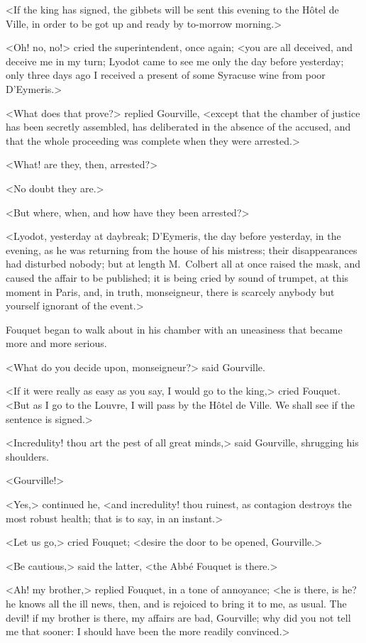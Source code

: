 <If the king has signed, the gibbets will be sent this evening to the Hôtel de Ville, in order to be got up and ready by to-morrow morning.>

<Oh! no, no!> cried the superintendent, once again; <you are all deceived, and deceive me in my turn; Lyodot came to see me only the day before yesterday; only three days ago I received a present of some Syracuse wine from poor D'Eymeris.>

<What does that prove?> replied Gourville, <except that the chamber of justice has been secretly assembled, has deliberated in the absence of the accused, and that the whole proceeding was complete when they were arrested.>

<What! are they, then, arrested?>

<No doubt they are.>

<But where, when, and how have they been arrested?>

<Lyodot, yesterday at daybreak; D'Eymeris, the day before yesterday, in the evening, as he was returning from the house of his mistress; their disappearances had disturbed nobody; but at length M.~Colbert all at once raised the mask, and caused the affair to be published; it is being cried by sound of trumpet, at this moment in Paris, and, in truth, monseigneur, there is scarcely anybody but yourself ignorant of the event.>

Fouquet began to walk about in his chamber with an uneasiness that became more and more serious.

<What do you decide upon, monseigneur?> said Gourville.

<If it were really as easy as you say, I would go to the king,> cried Fouquet. <But as I go to the Louvre, I will pass by the Hôtel de Ville. We shall see if the sentence is signed.>

<Incredulity! thou art the pest of all great minds,> said Gourville, shrugging his shoulders.

<Gourville!>

<Yes,> continued he, <and incredulity! thou ruinest, as contagion destroys the most robust health; that is to say, in an instant.>

<Let us go,> cried Fouquet; <desire the door to be opened, Gourville.>

<Be cautious,> said the latter, <the Abbé Fouquet is there.>

<Ah! my brother,> replied Fouquet, in a tone of annoyance; <he is there, is he? he knows all the ill news, then, and is rejoiced to bring it to me, as usual. The devil! if my brother is there, my affairs are bad, Gourville; why did you not tell me that sooner: I should have been the more readily convinced.>

